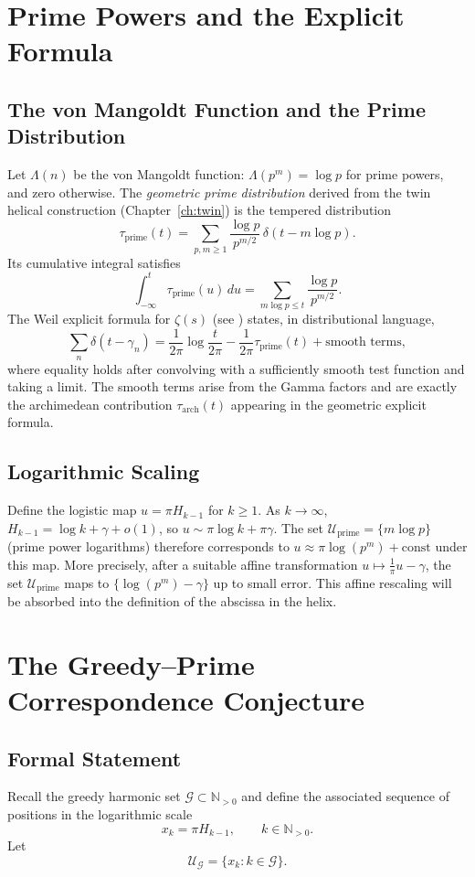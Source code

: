\documentclass[12pt,a4paper,twoside,openright]{book}
\newcommand{\N}{\mathbb{N}}
\begin{document}
\chapter{Prime Powers and the Explicit Formula}
\section{The von Mangoldt Function and the Prime Distribution}
Let \(\Lambda(n)\) be the von Mangoldt function: \(\Lambda(p^m)=\log p\) for prime powers, and zero otherwise.  The \emph{geometric prime distribution} derived from the twin helical construction (Chapter~\ref{ch:twin}) is the tempered distribution
\[
\tau_{\text{prime}}(t) = \sum_{p,m\ge 1} \frac{\log p}{p^{m/2}} \, \delta(t - m\log p).
\]
Its cumulative integral satisfies
\[
\int_{-\infty}^{t} \tau_{\text{prime}}(u)\,du = \sum_{m\log p \le t} \frac{\log p}{p^{m/2}} .
\]
The Weil explicit formula for \(\zeta(s)\) (see \cite{Weil}) states, in distributional language,
\[
\sum_{n} \delta(t-\gamma_n) = \frac{1}{2\pi}\log\frac{t}{2\pi} - \frac{1}{2\pi} \tau_{\text{prime}}(t) + \text{smooth terms},
\tag{1}
\]
where equality holds after convolving with a sufficiently smooth test function and taking a limit.  The smooth terms arise from the Gamma factors and are exactly the archimedean contribution \(\tau_{\text{arch}}(t)\) appearing in the geometric explicit formula.

\section{Logarithmic Scaling}
Define the logistic map \(u = \pi H_{k-1}\) for \(k\ge1\).  As \(k\to\infty\), \(H_{k-1} = \log k + \gamma + o(1)\), so \(u \sim \pi \log k + \pi\gamma\).  The set \(\mathcal{U}_{\text{prime}} = \{ m\log p \}\) (prime power logarithms) therefore corresponds to \(u \approx \pi \log(p^m) + \text{const}\) under this map.  More precisely, after a suitable affine transformation \(u \mapsto \frac{1}{\pi}u - \gamma\), the set \(\mathcal{U}_{\text{prime}}\) maps to \(\{\log(p^m) - \gamma\}\) up to small error.  This affine rescaling will be absorbed into the definition of the abscissa in the helix.

\chapter{The Greedy--Prime Correspondence Conjecture}
\section{Formal Statement}
Recall the greedy harmonic set \(\mathcal{G}\subset\N_{>0}\) and define the associated sequence of positions in the logarithmic scale
\[
x_k = \pi H_{k-1}, \qquad k\in\N_{>0}.
\]
Let
\[
\mathcal{U}_{\mathcal{G}} = \{ x_k : k \in \mathcal{G} \}.
\]
\end{document}
